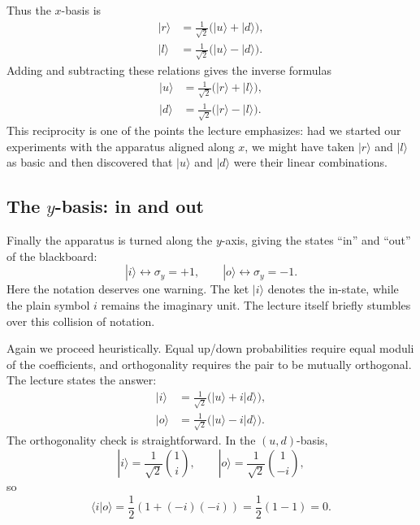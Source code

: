 Thus the \(x\)-basis is
\begin{align}
|r\rangle &= \frac{1}{\sqrt2}\bigl(|u\rangle+|d\rangle\bigr),\\
|l\rangle &= \frac{1}{\sqrt2}\bigl(|u\rangle-|d\rangle\bigr).
\end{align}
Adding and subtracting these relations gives the inverse formulas
\begin{align}
|u\rangle &= \frac{1}{\sqrt2}\bigl(|r\rangle+|l\rangle\bigr),\\
|d\rangle &= \frac{1}{\sqrt2}\bigl(|r\rangle-|l\rangle\bigr).
\end{align}
This reciprocity is one of the points the lecture emphasizes: had we started our experiments with the apparatus aligned along \(x\), we might have taken \(|r\rangle\) and \(|l\rangle\) as basic and then discovered that \(|u\rangle\) and \(|d\rangle\) were their linear combinations.

\subsection{The \(y\)-basis: in and out}

Finally the apparatus is turned along the \(y\)-axis, giving the states ``in'' and ``out'' of the blackboard:
\[
|i\rangle \leftrightarrow \sigma_y=+1,
\qquad
|o\rangle \leftrightarrow \sigma_y=-1.
\]
Here the notation deserves one warning. The ket \(|i\rangle\) denotes the in-state, while the plain symbol \(i\) remains the imaginary unit. The lecture itself briefly stumbles over this collision of notation.

Again we proceed heuristically. Equal up/down probabilities require equal moduli of the coefficients, and orthogonality requires the pair to be mutually orthogonal. The lecture states the answer:
\begin{align}
|i\rangle &= \frac{1}{\sqrt2}\bigl(|u\rangle+i|d\rangle\bigr),\\
|o\rangle &= \frac{1}{\sqrt2}\bigl(|u\rangle-i|d\rangle\bigr).
\end{align}
The orthogonality check is straightforward. In the \((u,d)\)-basis,
\[
|i\rangle=\frac{1}{\sqrt2}\binom{1}{i},
\qquad
|o\rangle=\frac{1}{\sqrt2}\binom{1}{-i},
\]
so
\begin{equation}
\langle i|o\rangle
=
\frac12\left(1+(-i)(-i)\right)
=
\frac12(1-1)
=
0.
\end{equation}

